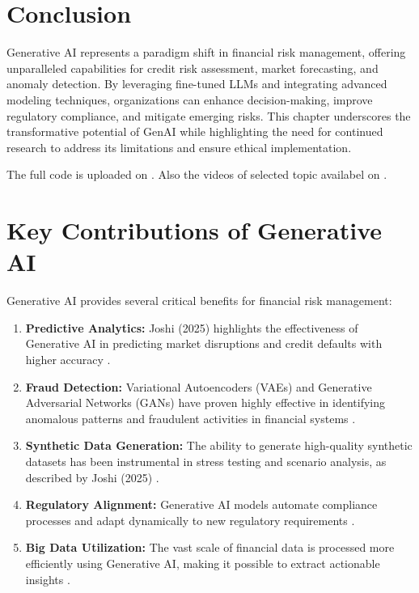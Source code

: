 \documentclass[a4paper,headinclude=on,footinclude=on,12pt,oneside]{scrbook}
\begin{document}
\section{Conclusion}

Generative AI represents a paradigm shift in financial risk management, offering unparalleled capabilities for credit risk assessment, market forecasting, and anomaly detection. By leveraging fine-tuned LLMs and integrating advanced modeling techniques, organizations can enhance decision-making, improve regulatory compliance, and mitigate emerging risks. This chapter underscores the transformative potential of GenAI while highlighting the need for continued research to address its limitations and ensure ethical implementation.

The full code is uploaded on \cite{JoshiGit2025}.
Also the videos of selected topic availabel on \cite{JoshiYouTube2025}.

\section*{Key Contributions of Generative AI}
Generative AI provides several critical benefits for financial risk management:
\begin{enumerate}
	\item \textbf{Predictive Analytics:} Joshi (2025) highlights the effectiveness of Generative AI in predicting market disruptions and credit defaults with higher accuracy \cite{JoshiIJFMR2025}.
	\item \textbf{Fraud Detection:} Variational Autoencoders (VAEs) and Generative Adversarial Networks (GANs) have proven highly effective in identifying anomalous patterns and fraudulent activities in financial systems \cite{JoshiCSEIT2025}.
	\item \textbf{Synthetic Data Generation:} The ability to generate high-quality synthetic datasets has been instrumental in stress testing and scenario analysis, as described by Joshi (2025) \cite{JoshiIJIREM2025}.
	\item \textbf{Regulatory Alignment:} Generative AI models automate compliance processes and adapt dynamically to new regulatory requirements \cite{JoshiIJIREM2025}.
	\item \textbf{Big Data Utilization:} The vast scale of financial data is processed more efficiently using Generative AI, making it possible to extract actionable insights \cite{JoshiIJIREM2025}.
\end{enumerate}
\end{document}
